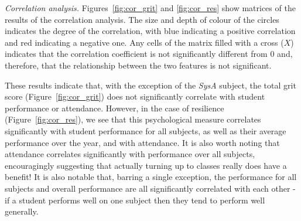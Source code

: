 \documentclass[sigconf]{acmart}
\begin{document}
{\em Correlation analysis.}
Figures~\ref{fig:cor_grit} and \ref{fig:cor_res} show matrices of the results of the correlation analysis. The size and depth of colour of the circles indicates the degree of the correlation, with blue indicating a positive correlation and red indicating a negative one. Any cells of the matrix filled with a cross ($X$) indicates that the correlation coefficient is not significantly different from 0 and, therefore, that the relationship between the two features is not significant.

These results indicate that, with the exception of the {\em SysA} subject, the total grit score (Figure~\ref{fig:cor_grit}) does not significantly correlate with student performance or attendance. However, in the case of resilience (Figure~\ref{fig:cor_res}), we see that this psychological measure correlates significantly with student performance for all subjects, as well as their average performance over the year, and with attendance. It is also worth noting that attendance correlates significantly with performance over all subjects, encouragingly suggesting that actually turning up to classes really does have a benefit! It is also notable that, barring a single exception, the performance for all subjects and overall performance are all significantly correlated with each other - if a student performs well on one subject then they tend to perform well generally. 

\end{document}
